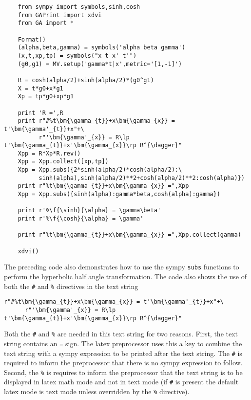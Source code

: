 \documentclass[10pt]{article}
\newcommand{\lp}{\left (}
\newcommand{\rp}{\right )}
\newcommand{\f}[2]{{#1}\lp {#2} \rp}
\newcommand{\T}[1]{\texttt{#1}}
\begin{document}
\begin{lstlisting}
    from sympy import symbols,sinh,cosh
    from GAPrint import xdvi
    from GA import *

    Format()
    (alpha,beta,gamma) = symbols('alpha beta gamma')
    (x,t,xp,tp) = symbols("x t x' t'")
    (g0,g1) = MV.setup('gamma*t|x',metric='[1,-1]')

    R = cosh(alpha/2)+sinh(alpha/2)*(g0^g1)
    X = t*g0+x*g1
    Xp = tp*g0+xp*g1

    print 'R =',R
    print r"#%t\bm{\gamma_{t}}+x\bm{\gamma_{x}} = t'\bm{\gamma'_{t}}+x"+\
          r"'\bm{\gamma'_{x}} = R\lp t'\bm{\gamma_{t}}+x'\bm{\gamma_{x}}\rp R^{\dagger}"
    Xpp = R*Xp*R.rev()
    Xpp = Xpp.collect([xp,tp])
    Xpp = Xpp.subs({2*sinh(alpha/2)*cosh(alpha/2):\
          sinh(alpha),sinh(alpha/2)**2+cosh(alpha/2)**2:cosh(alpha)})
    print r"%t\bm{\gamma_{t}}+x\bm{\gamma_{x}} =",Xpp
    Xpp = Xpp.subs({sinh(alpha):gamma*beta,cosh(alpha):gamma})

    print r'%\f{\sinh}{\alpha} = \gamma\beta'
    print r'%\f{\cosh}{\alpha} = \gamma'

    print r"%t\bm{\gamma_{t}}+x\bm{\gamma_{x}} =",Xpp.collect(gamma)

    xdvi()
\end{lstlisting}

The preceding code also demonstrates how to use the sympy \T{subs} functions
to perform the hyperbolic half angle transformation.  The code also shows
the use of both the \T{\#} and \T{\%} directives in the text string
\begin{lstlisting}
r"#%t\bm{\gamma_{t}}+x\bm{\gamma_{x}} = t'\bm{\gamma'_{t}}+x"+\
      r"'\bm{\gamma'_{x}} = R\lp t'\bm{\gamma_{t}}+x'\bm{\gamma_{x}}\rp R^{\dagger}"
\end{lstlisting}
Both the \T{\#} and \T{\%} are needed in this text string for two reasons.  First, the text string contains an \T{=} sign.  The latex preprocessor
uses this a key to combine the text string with a sympy expression to be printed after the text string.  The \T{\#} is required to inform
the preprocessor that there is no sympy expression to follow.  Second, the \T{\%} is requires to inform the preprocessor that the text
string is to be displayed in latex math mode and not in text mode (if \T{\#} is present the default latex mode is text mode unless
overridden by the \T{\%} directive).
\end{document}
